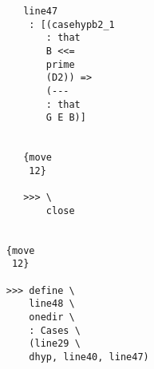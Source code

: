 \documentclass[12pt]{article}
\begin{document}
\begin{verbatim}
                                       line47 
                                        : [(casehypb2_1 
                                           : that 
                                           B <<= 
                                           prime 
                                           (D2)) => 
                                           (--- 
                                           : that 
                                           G E B)]


                                       {move 
                                        12}

                                       >>> \
                                           close


                                    {move 
                                     12}

                                    >>> define \
                                        line48 \
                                        onedir \
                                        : Cases \
                                        (line29 \
                                        dhyp, line40, line47)



\end{verbatim}
\end{document}
